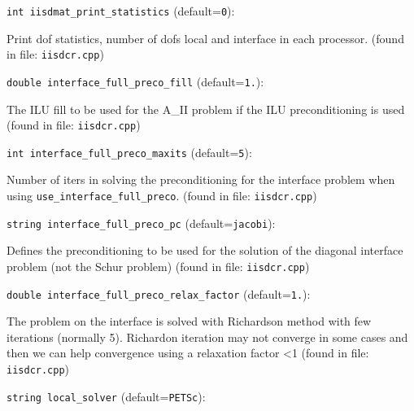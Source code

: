 \item\verb+int iisdmat_print_statistics+ {\rm(default=\verb|0|)}:

Print dof statistics, number of dofs local and interface in each
processor. 
 (found in file: \verb+iisdcr.cpp+)
\item\verb+double interface_full_preco_fill+ {\rm(default=\verb|1.|)}:

The ILU fill to be used for the A_II problem if the
ILU preconditioning is used
 (found in file: \verb+iisdcr.cpp+)
\item\verb+int interface_full_preco_maxits+ {\rm(default=\verb|5|)}:

Number of iters in solving the preconditioning for the 
interface problem when using \verb+use_interface_full_preco+. 
 (found in file: \verb+iisdcr.cpp+)
\item\verb+string interface_full_preco_pc+ {\rm(default=\verb|jacobi|)}:

Defines the preconditioning to be used for the solution
of the diagonal interface problem (not the Schur problem)
 (found in file: \verb+iisdcr.cpp+)
\item\verb+double interface_full_preco_relax_factor+ {\rm(default=\verb|1.|)}:

The problem on the interface is solved with Richardson method
with few iterations (normally 5). Richardon iteration may not
converge in some cases and then we can help convergence using a
relaxation factor <1
 (found in file: \verb+iisdcr.cpp+)
\item\verb+string local_solver+ {\rm(default=\verb|PETSc|)}:


